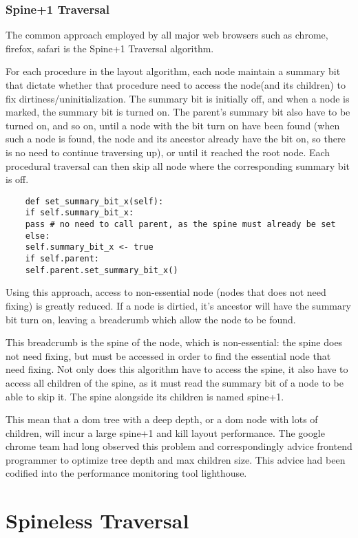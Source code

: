 \documentclass[format=acmsmall, review=false, screen=true]{acmart}
\begin{document}
\subsubsection{Spine+1 Traversal}
The common approach employed by all major web browsers such as chrome, firefox, safari is the Spine+1 Traversal algorithm.

For each procedure in the layout algorithm, each node maintain a summary bit that dictate whether that procedure need to access the node(and its children) to fix dirtiness/uninitialization. The summary bit is initially off, and when a node is marked, the summary bit is turned on. The parent's summary bit also have to be turned on, and so on, until a node with the bit turn on have been found (when such a node is found, the node and its ancestor already have the bit on, so there is no need to continue traversing up), or until it reached the root node.  Each procedural traversal can then skip all node where the corresponding summary bit is off.

\begin{verbatim}
	def set_summary_bit_x(self):
	if self.summary_bit_x:
	pass # no need to call parent, as the spine must already be set
	else:
	self.summary_bit_x <- true
	if self.parent:
	self.parent.set_summary_bit_x()
\end{verbatim}

Using this approach, access to non-essential node (nodes that does not need fixing) is greatly reduced. If a node is dirtied, it's ancestor will have the summary bit turn on, leaving a breadcrumb which allow the node to be found.

This breadcrumb is the spine of the node, which is non-essential: the spine does not need fixing, but must be accessed in order to find the essential node that need fixing. Not only does this algorithm have to access the spine, it also have to access all children of the spine, as it must read the summary bit of a node to be able to skip it. The spine alongside its children is named spine+1.

This mean that a dom tree with a deep depth, or a dom node with lots of children, will incur a large spine+1 and kill layout performance. The google chrome team had long observed this problem and correspondingly advice frontend programmer to optimize tree depth and max children size. This advice had been codified into the performance monitoring tool lighthouse.

\section{Spineless Traversal}
\end{document}

